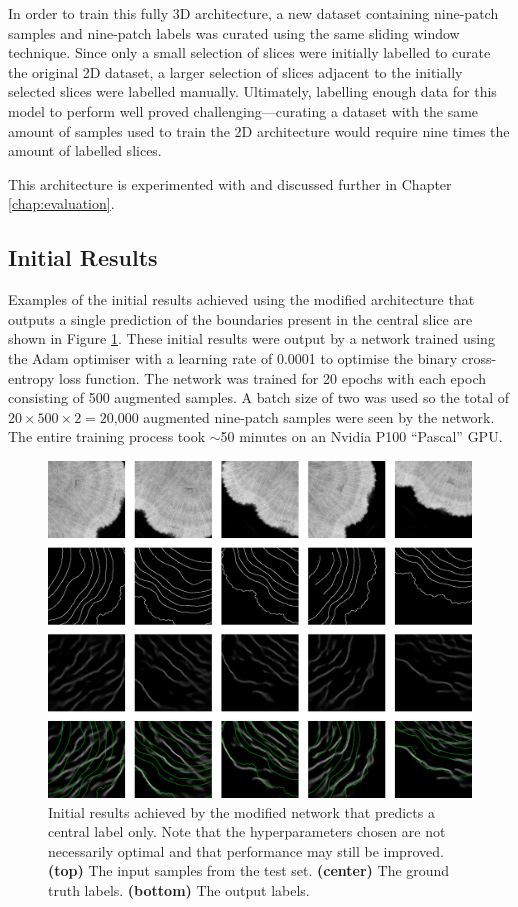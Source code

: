 In order to train this fully 3D architecture, a new dataset containing nine-patch samples and nine-patch labels was curated using the same sliding window technique. Since only a small selection of slices were initially labelled to curate the original 2D dataset, a larger selection of slices adjacent to the initially selected slices were labelled manually. Ultimately, labelling enough data for this model to perform well proved challenging---curating a dataset with the same amount of samples used to train the 2D architecture would require nine times the amount of labelled slices.

This architecture is experimented with and discussed further in Chapter \ref{chap:evaluation}.

\subsection{Initial Results}

Examples of the initial results achieved using the modified architecture that outputs a single prediction of the boundaries present in the central slice are shown in Figure \ref{fig:outputs2}. These initial results were output by a network trained using the Adam optimiser with a learning rate of 0.0001 to optimise the binary cross-entropy loss function. The network was trained for 20 epochs with each epoch consisting of 500 augmented samples. A batch size of two was used so the total of $20\times500\times2=\text{20,000}$ augmented nine-patch samples were seen by the network. The entire training process took ${\sim}$50 minutes on an Nvidia P100 ``Pascal'' GPU.

\begin{figure}[t]
    \centering
    \includegraphics[width=1\textwidth]{images/initial-outputs-3D.png}
    \caption{Initial results achieved by the modified network that predicts a central label only. Note that the hyperparameters chosen are not necessarily optimal and that performance may still be improved. \textbf{(top)} The input samples from the test set. \textbf{(center)} The ground truth labels. \textbf{(bottom)} The output labels.}
    \label{fig:outputs2}
\end{figure}

